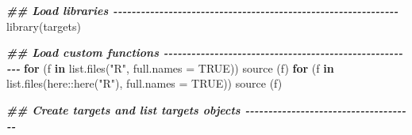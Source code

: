 \documentclass[
  12pt,
]{book}
\newenvironment{Shaded}{\begin{snugshade}}{\end{snugshade}}
\newcommand{\AttributeTok}[1]{\textcolor[rgb]{0.77,0.63,0.00}{#1}}
\newcommand{\ConstantTok}[1]{\textcolor[rgb]{0.00,0.00,0.00}{#1}}
\newcommand{\ControlFlowTok}[1]{\textcolor[rgb]{0.13,0.29,0.53}{\textbf{#1}}}
\newcommand{\DocumentationTok}[1]{\textcolor[rgb]{0.56,0.35,0.01}{\textbf{\textit{#1}}}}
\newcommand{\FunctionTok}[1]{\textcolor[rgb]{0.00,0.00,0.00}{#1}}
\newcommand{\NormalTok}[1]{#1}
\newcommand{\SpecialCharTok}[1]{\textcolor[rgb]{0.00,0.00,0.00}{#1}}
\newcommand{\StringTok}[1]{\textcolor[rgb]{0.31,0.60,0.02}{#1}}
\begin{document}
\begin{Shaded}
\begin{Highlighting}[]
\DocumentationTok{\#\# Load libraries {-}{-}{-}{-}{-}{-}{-}{-}{-}{-}{-}{-}{-}{-}{-}{-}{-}{-}{-}{-}{-}{-}{-}{-}{-}{-}{-}{-}{-}{-}{-}{-}{-}{-}{-}{-}{-}{-}{-}{-}{-}{-}{-}{-}{-}{-}{-}{-}{-}{-}{-}{-}{-}{-}{-}{-}{-}{-}{-}{-}{-}{-}}
\FunctionTok{library}\NormalTok{(targets)}



\DocumentationTok{\#\# Load custom functions {-}{-}{-}{-}{-}{-}{-}{-}{-}{-}{-}{-}{-}{-}{-}{-}{-}{-}{-}{-}{-}{-}{-}{-}{-}{-}{-}{-}{-}{-}{-}{-}{-}{-}{-}{-}{-}{-}{-}{-}{-}{-}{-}{-}{-}{-}{-}{-}{-}{-}{-}{-}{-}{-}{-}}
\ControlFlowTok{for}\NormalTok{ (f }\ControlFlowTok{in} \FunctionTok{list.files}\NormalTok{(}\StringTok{"R"}\NormalTok{, }\AttributeTok{full.names =} \ConstantTok{TRUE}\NormalTok{)) }\FunctionTok{source}\NormalTok{ (f)}
\ControlFlowTok{for}\NormalTok{ (f }\ControlFlowTok{in} \FunctionTok{list.files}\NormalTok{(here}\SpecialCharTok{::}\FunctionTok{here}\NormalTok{(}\StringTok{"R"}\NormalTok{), }\AttributeTok{full.names =} \ConstantTok{TRUE}\NormalTok{)) }\FunctionTok{source}\NormalTok{ (f)}


\DocumentationTok{\#\# Create targets and list targets objects {-}{-}{-}{-}{-}{-}{-}{-}{-}{-}{-}{-}{-}{-}{-}{-}{-}{-}{-}{-}{-}{-}{-}{-}{-}{-}{-}{-}{-}{-}{-}{-}{-}{-}{-}{-}{-}}


\end{Highlighting}
\end{Shaded}


  
\end{document}

